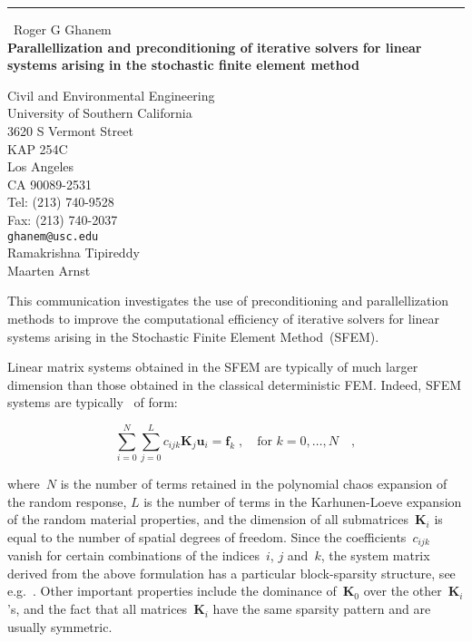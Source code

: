 \documentclass{report}
\begin{document}
\begin{center}
\rule{6in}{1pt} \
{\large Roger G Ghanem \\
{\bf Parallellization and preconditioning of iterative solvers for linear systems arising in the stochastic finite element method}}

Civil and Environmental Engineering \\ University of Southern California \\ 3620 S Vermont Street \\ KAP 254C \\ Los Angeles \\ CA 90089-2531 \\ Tel: (213) 740-9528 \\ Fax: (213) 740-2037
\\
{\tt ghanem@usc.edu}\\
Ramakrishna Tipireddy\\
Maarten Arnst\end{center}

This communication investigates the use of preconditioning and
parallellization methods to improve the computational efficiency of
iterative solvers for linear systems arising in the Stochastic Finite
Element Method~(SFEM).

Linear matrix systems obtained in the SFEM are typically of much larger
dimension than those obtained in the classical deterministic FEM. Indeed,
SFEM systems are typically~\citep{ghanem1991} of form:

\begin{equation}
\sum_{i=0}^{N}\sum_{j=0}^{L}c_{ijk}\boldsymbol{K}_{j}\boldsymbol{u}_{i}=\boldsymbol{f}_{k}\;,\quad\text{for~$k
= 0,\ldots,N$}\quad,\label{eq:sfemsystem}
\end{equation}

where~$N$ is the number of terms retained in the polynomial chaos
expansion of the random response, $L$ is the number of terms in the
Karhunen-Loeve expansion of the random material properties, and the
dimension of all submatrices~$\boldsymbol{K}_{i}$ is equal to the number
of spatial degrees of freedom. Since the coefficients~$c_{ijk}$ vanish
for certain combinations of the indices~$i$, $j$ and~$k$, the system
matrix derived from the above formulation has a particular block-sparsity
structure, see e.g.~\citep{pellisetti2000}. Other important properties
include the dominance of~$\boldsymbol{K}_0$ over the
other~$\boldsymbol{K}_i$'s, and the fact that all
matrices~$\boldsymbol{K}_i$ have the same sparsity pattern and are
usually symmetric.
\end{document}
